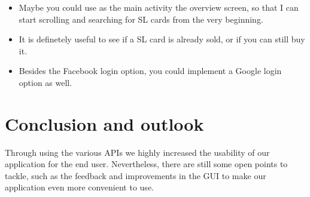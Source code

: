 \documentclass[11pt,twoside,a4paper]{report}
\begin{document}
\begin{itemize}

\item Maybe you could use as the main activity the overview screen, so that I can start scrolling and searching for SL cards from the very beginning.

\item It is definetely useful to see if a SL card is already sold, or if you can still buy it.

\item Besides the Facebook login option, you could implement a Google login option as well.

\end{itemize}

\section{Conclusion and outlook}

Through using the various APIs we highly increased the usability of our application for the end user. Nevertheless, there are still some open points to tackle, such as the feedback and improvements in the GUI to make our application even more convenient to use.
\end{document}

